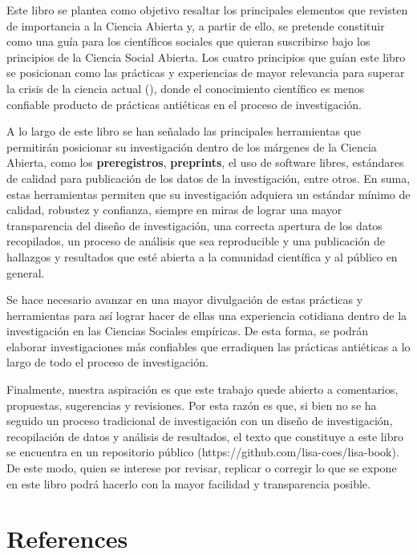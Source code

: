 \documentclass[
  spanish,
  a4paper,
  oneside]{scrbook}
\begin{document}
Este libro se plantea como objetivo resaltar los principales elementos
que revisten de importancia a la Ciencia Abierta y, a partir de ello, se
pretende constituir como una guía para los científicos sociales que
quieran suscribirse bajo los principios de la Ciencia Social Abierta.
Los cuatro principios que guían este libro se posicionan como las
prácticas y experiencias de mayor relevancia para superar la crisis de
la ciencia actual (),
donde el conocimiento científico es menos confiable producto de
prácticas antiéticas en el proceso de investigación.

A lo largo de este libro se han señalado las principales herramientas
que permitirán posicionar su investigación dentro de los márgenes de la
Ciencia Abierta, como los \textbf{preregistros}, \textbf{preprints}, el
uso de software libres, estándares de calidad para publicación de los
datos de la investigación, entre otros. En suma, estas herramientas
permiten que su investigación adquiera un estándar mínimo de calidad,
robustez y confianza, siempre en miras de lograr una mayor transparencia
del diseño de investigación, una correcta apertura de los datos
recopilados, un proceso de análisis que sea reproducible y una
publicación de hallazgos y resultados que esté abierta a la comunidad
científica y al público en general.

Se hace necesario avanzar en una mayor divulgación de estas prácticas y
herramientas para así lograr hacer de ellas una experiencia cotidiana
dentro de la investigación en las Ciencias Sociales empíricas. De esta
forma, se podrán elaborar investigaciones más confiables que erradiquen
las prácticas antiéticas a lo largo de todo el proceso de investigación.

Finalmente, nuestra aspiración es que este trabajo quede abierto a
comentarios, propuestas, sugerencias y revisiones. Por esta razón es
que, si bien no se ha seguido un proceso tradicional de investigación
con un diseño de investigación, recopilación de datos y análisis de
resultados, el texto que constituye a este libro se encuentra en un
repositorio público (https://github.com/lisa-coes/lisa-book). De este
modo, quien se interese por revisar, replicar o corregir lo que se
expone en este libro podrá hacerlo con la mayor facilidad y
transparencia posible.


\chapter*{References}\label{references}
\end{document}
